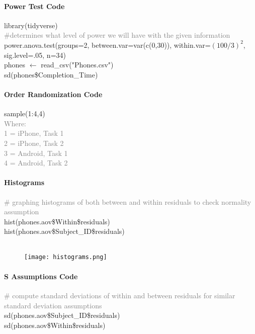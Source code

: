 \documentclass[conference]{IEEEtran}
\begin{document}
\paragraph{Power Test Code}


\hfill\break \noindent library(tidyverse)\\
\textcolor{gray}{\#determines what level of power we will have with the given information} \\
power.anova.test(groups=2, between.var=var(c(0,30)), within.var=$(100/3)^2$, sig.level=.05, n=34)\\
phones $\leftarrow$ read\_csv("Phones.csv")\\
sd(phones\$Completion\_Time)\\

\paragraph{Order Randomization Code}

\hfill\break \noindent sample(1:4,4)\\
\textcolor{gray}{Where: \\
1 = iPhone, Task 1\\
2 = iPhone, Task 2\\
3 = Android, Task 1\\
4 = Android, Task 2 }\\

\paragraph{Histograms} 
\hfill\break \noindent \textcolor{gray}{\# graphing histograms of both between and within residuals to check normality assumption} \\
hist(phones.aov\$Within\$residuals) \\
hist(phones.aov\$Subject\_ID\$residuals) \\ \\ 
\begin{figure}[htbp]
    \centering
    \texttt{[image: histograms.png]}
    \caption{}
    \label{fig:fig3}
\end{figure} 
\noindent 


\paragraph{S Assumptions Code}

\hfill\break\noindent \textcolor{gray}{\# compute standard deviations of within and between residuals for similar standard deviation assumptions} \\
\noindent sd(phones.aov\$Subject\_ID\$residuals) \\
\noindent sd(phones.aov\$Within\$residuals) \\ 
\end{document}
